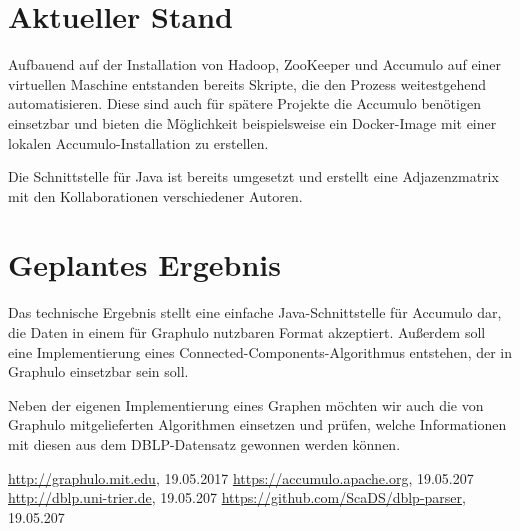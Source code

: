 \documentclass{article}
\begin{document}
\section{Aktueller Stand}

Aufbauend auf der Installation von Hadoop, ZooKeeper und Accumulo auf einer virtuellen Maschine entstanden bereits Skripte, die den Prozess weitestgehend automatisieren. Diese sind auch für spätere Projekte die Accumulo benötigen einsetzbar und bieten die Möglichkeit beispielsweise ein Docker-Image mit einer lokalen Accumulo-Installation zu erstellen.

Die Schnittstelle für Java ist bereits umgesetzt und erstellt eine Adjazenzmatrix mit den Kollaborationen verschiedener Autoren.


\section{Geplantes Ergebnis}


Das technische Ergebnis stellt eine einfache Java-Schnittstelle für Accumulo dar, die Daten in einem für Graphulo nutzbaren Format akzeptiert. Außerdem soll eine Implementierung eines Connected-Components-Algorithmus entstehen, der in Graphulo einsetzbar sein soll.

Neben der eigenen Implementierung eines Graphen möchten wir auch die von Graphulo mitgelieferten Algorithmen einsetzen und prüfen, welche Informationen mit diesen aus dem DBLP-Datensatz gewonnen werden können.


\begin{thebibliography}{laengste Labelbreite}
	 \url{http://graphulo.mit.edu}, 19.05.2017
	 \url{https://accumulo.apache.org}, 19.05.207
	 \url{http://dblp.uni-trier.de}, 19.05.207
	 \url{https://github.com/ScaDS/dblp-parser}, 19.05.207
\end{thebibliography}
\end{document}
